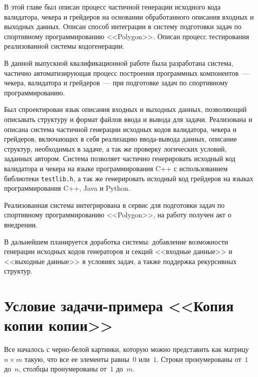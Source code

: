 \documentclass[times,specification,annotation]{style/itmo-student-thesis/itmo-student-thesis}
\begin{document}
\chapterconclusion

В этой главе был описан процесс частичной генерации исходного кода валидатора, чекера и грейдеров на основании обработанного описания входных и выходных данных. Описан способ интеграции в систему подготовки задач по спортивному программированию <<Polygon>>. Описан процесс тестирования реализованной системы кодогенерации.

\startconclusionpage

В данной выпускной квалификационной работе была разработана система, частично автоматизирующая процесс построения программных компонентов~--- чекера, валидатора и грейдеров~--- при подготовке задач по спортивному программированию.

Был спроектирован язык описания входных и выходных данных, позволяющий описывать структуру и формат файлов ввода и вывода для задачи. Реализована и описана система частичной генерации исходных кодов валидатора, чекера и грейдеров, включающих в себя реализацию ввода-вывода данных, описание структур, необходимых в задаче, а так же проверку логических условий, заданных автором. Система позволяет частично генерировать исходный код валидатора и чекера на языке программирования C++ с использованием библиотеки \texttt{testlib.h}, а так же генерировать исходный код грейдеров на языках программирования C++, Java и Python.

Реализованная система интегрирована в сервис для подготовки задач по спортивному программированию <<Polygon>>, на работу получен акт о внедрении.

В дальнейшем планируется доработка системы: добавление возможности генерации исходных кодов генераторов и секций <<входные данные>> и <<выходные данные>> в условиях задач, а также поддержка рекурсивных структур.

\printmainbibliography

\appendix

\chapter{Условие задачи-примера <<Копия копии копии>>}\label{statement1772F}


Все началось с черно-белой картинки, которую можно представить как матрицу $n \times m$ такую, что все ее элементы равны~$0$ или~$1$. Строки пронумерованы от~$1$ до~$n$, столбцы пронумерованы от~$1$ до~$m$.
\end{document}
